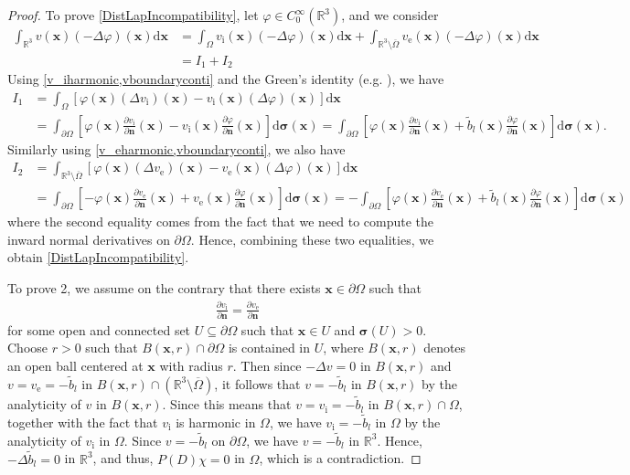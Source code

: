 \documentclass[reqno]{siamonline1116}
\numberwithin{theorem}{section}
\numberwithin{equation}{section}
\def\R{{\mathbb R}}
\def\rd{\mathrm{d}}
\def\Om{\Omega}
\def\f{\frac}
\def\p{\partial}
\def\bn{\boldsymbol{n}}
\def\x{\boldsymbol{x}}
\def\ssi{\boldsymbol{\sigma}}
\def\wt{\widetilde}
\begin{document}
\begin{proof}
To prove \cref{DistLapIncompatibility}, let $\varphi\in C_0^{\infty}(\R^3)$, and we consider
\begin{align*}
\int_{\R^3}v(\x)\left(-\Delta\varphi\right)(\x)\rd\x&=\int_{\Om}v_{\mathrm i}(\x)\left(-\Delta\varphi\right)(\x)\rd\x+\int_{\R^3\setminus\overline{\Om}}v_{\mathrm e}(\x)\left(-\Delta\varphi\right)(\x)\rd\x\\
&=I_1+I_2
\end{align*}
Using \cref{v_iharmonic,vboundaryconti} and the Green's identity (e.g. \cite{Evans2010}), we have
\begin{align*}
I_1&=\int_{\Om}\left[\varphi(\x)\left(\Delta v_{\mathrm i}\right)(\x)-v_{\mathrm i}(\x)\left(\Delta\varphi\right)(\x)\right]\rd\x\\
&=\int_{\p\Om}\left[\varphi(\x)\f{\p v_{\mathrm i}}{\p\bn}(\x)-v_{\mathrm i}(\x)\f{\p\varphi}{\p\bn}(\x)\right]\rd\ssi(\x)=\int_{\p\Om}\left[\varphi(\x)\f{\p v_{\mathrm i}}{\p\bn}(\x)+\wt{b}_l(\x)\f{\p\varphi}{\p\bn}(\x)\right]\rd\ssi(\x).
\end{align*}
Similarly using \cref{v_eharmonic,vboundaryconti}, we also have
\begin{align*}
I_2&=\int_{\R^3\setminus\overline{\Om}}\left[\varphi(\x)\left(\Delta v_{\mathrm e}\right)(\x)-v_{\mathrm e}(\x)\left(\Delta\varphi\right)(\x)\right]\rd\x\\
&=\int_{\p\Om}\left[-\varphi(\x)\f{\p v_{\mathrm e}}{\p\bn}(\x)+v_{\mathrm e}(\x)\f{\p\varphi}{\p\bn}(\x)\right]\rd\ssi(\x)=-\int_{\p\Om}\left[\varphi(\x)\f{\p v_{\mathrm e}}{\p\bn}(\x)+\wt{b}_l(\x)\f{\p\varphi}{\p\bn}(\x)\right]\rd\ssi(\x)
\end{align*}
where the second equality comes from the fact that we need to compute the inward normal derivatives on $\p\Om$. Hence, combining these two equalities, we obtain \cref{DistLapIncompatibility}.

To prove 2, we assume on the contrary that there exists $\x\in\p\Om$ such that
\begin{align*}
\f{\p v_{\mathrm i}}{\p\bn}=\f{\p v_{\mathrm e}}{\p\bn}
\end{align*}
for some open and connected set $U\subseteq\p\Om$ such that $\x\in U$ and $\ssi(U)>0$. Choose $r>0$ such that $B(\x,r)\cap\p\Om$ is contained in $U$, where $B(\x,r)$ denotes an open ball centered at $\x$ with radius $r$. Then since $-\Delta v=0$ in $B(\x,r)$ and $v=v_{\mathrm e}=-\wt{b}_l$ in $B(\x,r)\cap\left(\R^3\setminus\overline{\Om}\right)$, it follows that $v=-\wt{b}_l$ in $B(\x,r)$ by the analyticity of $v$ in $B(\x,r)$. Since this means that $v=v_{\mathrm i}=-\wt{b}_l$ in $B(\x,r)\cap\Om$, together with the fact that $v_{\mathrm i}$ is harmonic in $\Om$, we have $v_{\mathrm i}=-\wt{b}_l$ in $\Om$ by the analyticity of $v_{\mathrm i}$ in $\Om$. Since $v=-\wt{b}_l$ on $\p\Om$, we have $v=-\wt{b}_l$ in $\R^3$. Hence, $-\Delta\wt{b}_l=0$ in $\R^3$, and thus, $P(D)\chi=0$ in $\Om$, which is a contradiction.
\end{proof}
\end{document}
